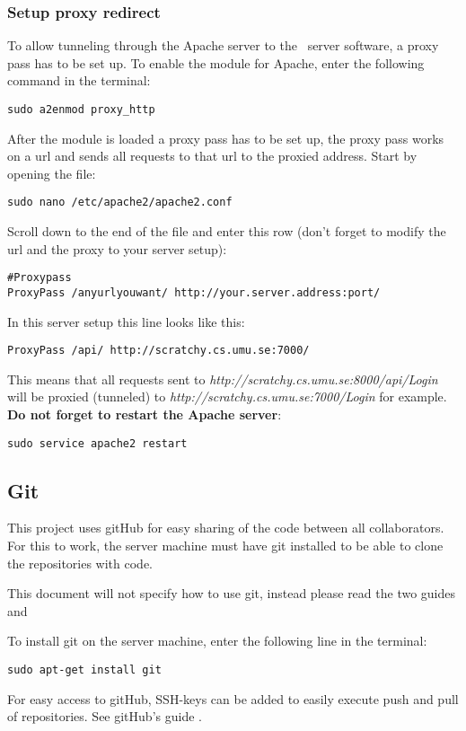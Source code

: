 \subsubsection{Setup proxy redirect}
To allow tunneling through the Apache server to the \appName\ server software, a proxy pass has to be set up.
To enable the module for Apache, enter the following command in the terminal:

\begin{verbatim}
sudo a2enmod proxy_http
\end{verbatim}
After the module is loaded a proxy pass has to be set up, the proxy pass works on a url and sends all requests to that url to the proxied address. Start by opening the file:
\begin{verbatim}
sudo nano /etc/apache2/apache2.conf
\end{verbatim}
Scroll down to the end of the file and enter this row (don't forget to modify the url and the proxy to your server setup):
\begin{verbatim}
#Proxypass 
ProxyPass /anyurlyouwant/ http://your.server.address:port/
\end{verbatim}
In this server setup this line looks like this:
\begin{verbatim}
ProxyPass /api/ http://scratchy.cs.umu.se:7000/
\end{verbatim}
This means that all requests sent to \emph{http://scratchy.cs.umu.se:8000/api/Login} will be proxied (tunneled) to
\emph{http://scratchy.cs.umu.se:7000/Login} for example. \textbf{Do not forget to restart the Apache server}:
\begin{verbatim}
sudo service apache2 restart
\end{verbatim}
\subsection{Git}
This project uses gitHub for easy sharing of the code between all collaborators. For this to work, the server machine must have git installed to be able to clone the repositories with code. 

This document will not specify how to use git, instead please read the two guides \cite{exp_gitguide} and \cite{exp_gitguide2}

To install git on the server machine, enter the following line in the terminal:
\begin{verbatim}sudo apt-get install git\end{verbatim}
For easy access to gitHub, SSH-keys can be added to easily execute push and pull of repositories. 
See gitHub's guide \cite{exp_sshguide}.

